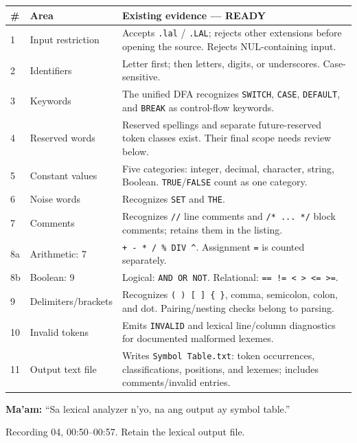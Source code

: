 \documentclass[11pt,a4paper]{article}
\newcommand{\code}[1]{\texttt{#1}}
\newcommand{\boxnote}[3]{\par\smallskip\begingroup\setlength{\fboxsep}{8pt}\colorbox{#1}{\parbox{\dimexpr\linewidth-2\fboxsep\relax}{\color{#2}\small #3}}\endgroup\par\smallskip}
\newcommand{\neutralbox}[1]{\boxnote{cream}{black}{#1}}
\newcommand{\profquote}[2]{\neutralbox{\textbf{Ma'am:} ``#1''\par{\footnotesize\color{muted}#2}}}
\begin{document}
{\small\renewcommand{\arraystretch}{1.21}
\begin{tabularx}{\linewidth}{@{}L{8mm}L{35mm}Y@{}}
\toprule
\textbf{\#} & \textbf{Area} & \textbf{Existing evidence --- \textcolor{ready}{READY}} \\ & Input restriction & Accepts \code{.lal} / \code{.LAL}; rejects other extensions before opening the source. Rejects NUL-containing input. \\
2 & Identifiers & Letter first; then letters, digits, or underscores. Case-sensitive. \\
3 & Keywords & The unified DFA recognizes \code{SWITCH}, \code{CASE}, \code{DEFAULT}, and \code{BREAK} as control-flow keywords. \\
4 & Reserved words & Reserved spellings and separate future-reserved token classes exist. Their final scope needs review below. \\
5 & Constant values & Five categories: integer, decimal, character, string, Boolean. \code{TRUE}/\code{FALSE} count as one category. \\
6 & Noise words & Recognizes \code{SET} and \code{THE}. \\
7 & Comments & Recognizes \code{//} line comments and \code{/* ... */} block comments; retains them in the listing. \\
8a & Arithmetic: 7 & \code{+ - * / \% DIV \textasciicircum}. Assignment \code{=} is counted separately. \\
8b & Boolean: 9 & Logical: \code{AND OR NOT}. Relational: \code{== != < > <= >=}. \\
9 & Delimiters/brackets & Recognizes \code{( ) [ ] \{ \}}, comma, semicolon, colon, and dot. Pairing/nesting checks belong to parsing. \\
10 & Invalid tokens & Emits \code{INVALID} and lexical line/column diagnostics for documented malformed lexemes. \\
11 & Output text file & Writes \code{Symbol Table.txt}: token occurrences, classifications, positions, and lexemes; includes comments/invalid entries. \\\bottomrule
\end{tabularx}}

\profquote{Sa lexical analyzer n'yo, na ang output ay symbol table.}{Recording 04, 00:50--00:57. Retain the lexical output file.}
\end{document}
